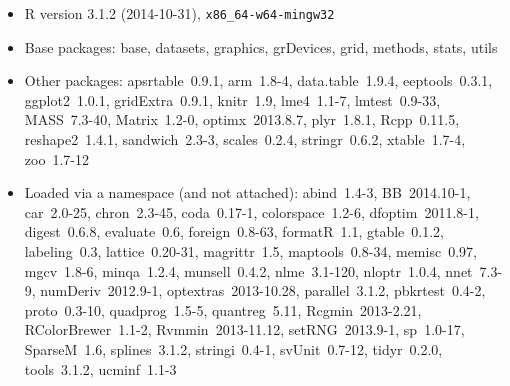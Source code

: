 \begin{itemize}\raggedright
  \item R version 3.1.2 (2014-10-31), \verb|x86_64-w64-mingw32|
  \item Base packages: base, datasets, graphics, grDevices, grid, methods,
    stats, utils
  \item Other packages: apsrtable~0.9.1, arm~1.8-4, data.table~1.9.4,
    eeptools~0.3.1, ggplot2~1.0.1, gridExtra~0.9.1, knitr~1.9, lme4~1.1-7,
    lmtest~0.9-33, MASS~7.3-40, Matrix~1.2-0, optimx~2013.8.7, plyr~1.8.1,
    Rcpp~0.11.5, reshape2~1.4.1, sandwich~2.3-3, scales~0.2.4,
    stringr~0.6.2, xtable~1.7-4, zoo~1.7-12
  \item Loaded via a namespace (and not attached): abind~1.4-3,
    BB~2014.10-1, car~2.0-25, chron~2.3-45, coda~0.17-1, colorspace~1.2-6,
    dfoptim~2011.8-1, digest~0.6.8, evaluate~0.6, foreign~0.8-63,
    formatR~1.1, gtable~0.1.2, labeling~0.3, lattice~0.20-31, magrittr~1.5,
    maptools~0.8-34, memisc~0.97, mgcv~1.8-6, minqa~1.2.4, munsell~0.4.2,
    nlme~3.1-120, nloptr~1.0.4, nnet~7.3-9, numDeriv~2012.9-1,
    optextras~2013-10.28, parallel~3.1.2, pbkrtest~0.4-2, proto~0.3-10,
    quadprog~1.5-5, quantreg~5.11, Rcgmin~2013-2.21, RColorBrewer~1.1-2,
    Rvmmin~2013-11.12, setRNG~2013.9-1, sp~1.0-17, SparseM~1.6,
    splines~3.1.2, stringi~0.4-1, svUnit~0.7-12, tidyr~0.2.0, tools~3.1.2,
    ucminf~1.1-3
\end{itemize}